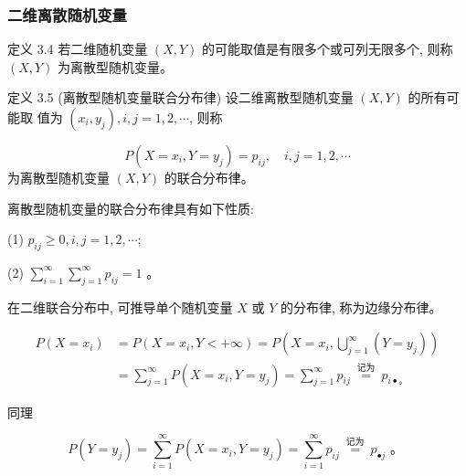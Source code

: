\documentclass{beamer}
\begin{document}
	\begin{frame}
		\frametitle{二维离散随机变量}
		定义 3.4 若二维随机变量 $(X, Y)$ 的可能取值是有限多个或可列无限多个, 则称 $(X, Y)$ 为离散型随机变量。
		
		定义 3.5 (离散型随机变量联合分布律) 设二维离散型随机变量 $(X, Y)$ 的所有可能取 值为 $\left(x_{i}, y_{j}\right), i, j=1,2, \cdots$, 则称
		
		$$
		P\left(X=x_{i}, Y=y_{j}\right)=p_{i j}, \quad i, j=1,2, \cdots
		$$
		为离散型随机变量 $(X, Y)$ 的联合分布律。
	\end{frame}
	
	\begin{frame}
		离散型随机变量的联合分布律具有如下性质:
		
		(1) $p_{i j} \geqslant 0, i, j=1,2, \cdots$;
		
		(2) $\sum_{i=1}^{\infty} \sum_{j=1}^{\infty} p_{i j}=1$ 。
		
	\end{frame}
	
	\begin{frame}
		在二维联合分布中, 可推导单个随机变量 $X$ 或 $Y$ 的分布律, 称为边缘分布律。
		
		$$
		\begin{aligned}
			P\left(X=x_{i}\right) & =P\left(X=x_{i}, Y<+\infty\right)=P\left(X=x_{i}, \bigcup_{j=1}^{\infty}\left(Y=y_{j}\right)\right) \\
			& =\sum_{j=1}^{\infty} P\left(X=x_{i}, Y=y_{j}\right)=\sum_{j=1}^{\infty} p_{i j} \stackrel{\text { 记为 }}{=} p_{i \bullet 。}
		\end{aligned}
		$$
		
		同理
		
		$$
		P\left(Y=y_{j}\right)=\sum_{i=1}^{\infty} P\left(X=x_{i}, Y=y_{j}\right)=\sum_{i=1}^{\infty} p_{i j} \stackrel{\text { 记为 }}{=} p_{\bullet j} \text { 。 }
		$$
	\end{frame}
	
\end{document}
